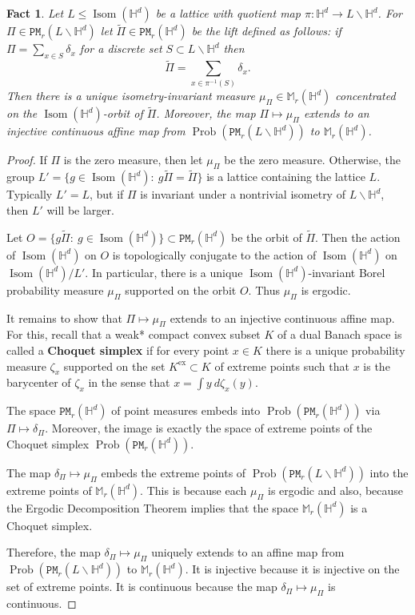 \documentclass[11pt]{amsart}
\newtheorem{fact}[theorem]{Fact}
\theoremstyle{definition}
\theoremstyle{remark}
\renewcommand{\H}{\mathbb{H}}
\newcommand{\M}{\mathbb{M}}
\newcommand{\cP}{\mathtt{PM}}
\newcommand{\Isom}{\operatorname{Isom}}
\newcommand{\Prob}{\operatorname{Prob}}
\begin{document}
\begin{fact}\label{fact:lift}
    Let $L \leq \Isom(\H^d)$ be a lattice with quotient map $\pi:\H^d \to L \backslash \H^d$. For $\Pi \in \cP_r(L \backslash \H^d)$ let $\widetilde{\Pi} \in \cP_r(\H^d)$ be the lift defined as follows: if $\Pi=\sum_{x \in S} \delta_x$ for a discrete set $S \subset L \backslash \H^d$ then
    $$\widetilde{\Pi} = \sum_{x \in \pi^{-1}(S)} \delta_x.$$
    Then there is a unique isometry-invariant measure $\mu_\Pi \in  \M_r(\H^d)$ concentrated on the $\Isom(\H^d)$-orbit of $\widetilde{\Pi}$. Moreover, the map $\Pi \mapsto \mu_\Pi$ extends to an injective continuous affine map from $\Prob(\cP_r(L \backslash \H^d))$ to  $\M_r(\H^d)$.
\end{fact}
\begin{proof}
If $\Pi$ is the zero measure, then let $\mu_\Pi$ be the zero measure. Otherwise, the group $L' = \{g \in \Isom(\H^d):~g\widetilde{\Pi}=\widetilde{\Pi}\}$ is a lattice containing the lattice $L$. Typically $L'=L$, but if $\Pi$ is invariant under a nontrivial isometry of $L \backslash \H^d$, then $L'$ will be larger.

Let $O=\{g\tilde{\Pi}:~ g\in \Isom(\H^d)\} \subset \cP_r(\H^d)$ be the orbit of $\tilde{\Pi}$. Then the action of $\Isom(\H^d)$ on $O$ is topologically conjugate to the action of $\Isom(\H^d)$ on $\Isom(\H^d)/L'$. In particular, there is a unique $\Isom(\H^d)$-invariant Borel probability measure $\mu_\Pi$ supported on the orbit $O$. Thus $\mu_\Pi$ is ergodic.

It remains to show that $\Pi \mapsto \mu_\Pi$ extends to an injective continuous affine map.  For this, recall that a weak* compact convex subset $K$ of a dual Banach space is called a {\bf Choquet simplex} if for every point $x\in K$ there is a unique probability measure $\zeta_x$ supported on the set $K^{\operatorname{ex}}\subset K$ of extreme points such that $x$ is the barycenter of $\zeta_x$ in the sense that $x = \int y~d\zeta_x(y)$.  

The space $\cP_r(\H^d)$ of point measures embeds into $\Prob(\cP_r(\H^d))$ via $\Pi \mapsto \delta_\Pi$. Moreover, the image is exactly the space of extreme points of the Choquet simplex $\Prob(\cP_r(\H^d))$.

The map $\delta_\Pi \mapsto \mu_\Pi$ embeds the extreme points of $\Prob(\cP_r(L \backslash \H^d))$ into the extreme points of $\M_r(\H^d)$. This is because each $\mu_\Pi$ is ergodic and also, because the Ergodic Decomposition Theorem \cite{MR1784210} implies that the space $\M_r(\H^d)$ is a Choquet simplex.

Therefore, the map $\delta_\Pi \mapsto \mu_\Pi$ uniquely extends to an affine map from $\Prob(\cP_r(L \backslash \H^d ))$ to $\M_r(\H^d)$. It is injective because it is injective on the set of extreme points. It is continuous because the map $\delta_\Pi \mapsto \mu_\Pi$ is continuous.
\end{proof}
\end{document}

